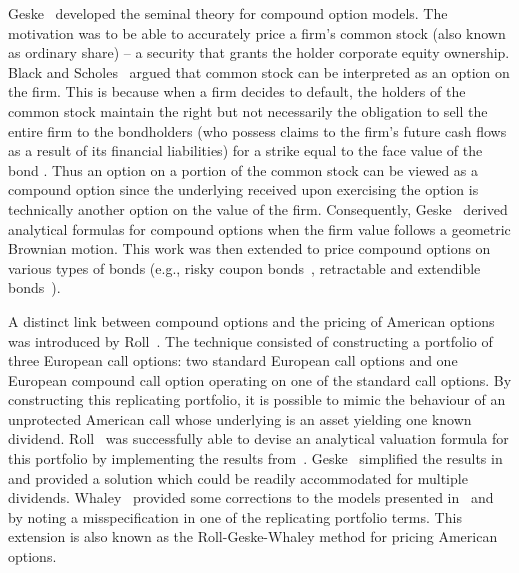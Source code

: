 Geske~\cite{Geske1979} developed the seminal theory for compound option models. The motivation was to be able to accurately price a firm's common stock (also known as ordinary share) -- a security that grants the holder corporate equity ownership. Black and Scholes~\cite{Black1973} argued that common stock can be interpreted as an option on the firm. This is because when a firm decides to default, the holders of the common stock maintain the right but not necessarily the obligation to sell the entire firm to the bondholders (who possess claims to the firm's future cash flows as a result of its financial liabilities) for a strike equal to the face value of the bond \cite{Kwok2008}. Thus an option on a portion of the common stock can be viewed as a compound option since the underlying received upon exercising the option is technically another option on the value of the firm. Consequently, Geske~\cite{Geske1979} derived analytical formulas for compound options when the firm value follows a geometric Brownian motion. This work was then extended to price compound options on various types of bonds (e.g., risky coupon bonds~\cite{Geske1977}, retractable and extendible bonds~\cite{Brennan1977, Ananthanarayanan1980, Longstaff1990}).

A distinct link between compound options and the pricing of American options was introduced by Roll~\cite{Roll1977}. The technique consisted of constructing a portfolio of three European call options: two standard European call options and one European compound call option operating on one of the standard call options. By constructing this replicating portfolio, it is possible to mimic the behaviour of an unprotected American call whose underlying is an asset yielding one known dividend. Roll~\cite{Roll1977} was successfully able to devise an analytical valuation formula for this portfolio by implementing the results from~\cite{Geske1979}. Geske~\cite{Geske1979b} simplified the results in~\cite{Roll1977} and provided a solution which could be readily accommodated for multiple dividends. Whaley~\cite{Whaley1982} provided some corrections to the models presented in~\cite{Roll1977} and~\cite{Geske1979} by noting a misspecification in one of the replicating portfolio terms. This extension is also known as the Roll-Geske-Whaley method for pricing American options.

